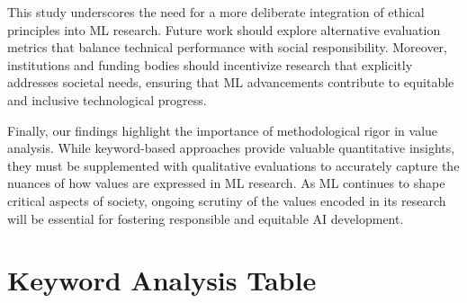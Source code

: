 \documentclass{article}
\begin{document}
This study underscores the need for a more deliberate integration of ethical principles into ML research. Future work should explore alternative evaluation metrics that balance technical performance 
with social responsibility. Moreover, institutions and funding bodies should incentivize research that explicitly addresses societal needs, ensuring that ML advancements contribute to equitable and 
inclusive technological progress.

Finally, our findings highlight the importance of methodological rigor in value analysis. While keyword-based approaches provide valuable quantitative insights, they must be supplemented with 
qualitative evaluations to accurately capture the nuances of how values are expressed in ML research. As ML continues to shape critical aspects of society, ongoing scrutiny of the values encoded in its 
research will be essential for fostering responsible and equitable AI development.







\appendix

\section{Keyword Analysis Table}
\end{document}
